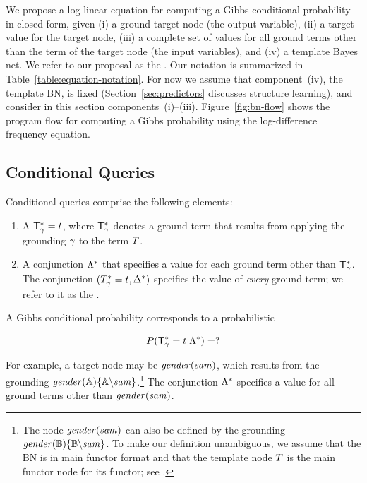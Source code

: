\documentclass[twoside,11pt]{article}
\begin{document}
We propose a log-linear equation for computing a Gibbs conditional probability in closed form, given (i) a ground target node (the output variable), (ii) a target value for the target node, (iii) a complete set of values for all ground terms other than the term of the target node (the input variables), and (iv) a template Bayes net. We refer to our proposal as the 
. Our notation is summarized in Table~\ref{table:equation-notation}. For now we assume that component~(iv), the template BN, is fixed (Section~\ref{sec:predictors} discusses structure learning), and consider in this section components~(i)--(iii). 
Figure~\ref{fig:bn-flow} shows the program flow for computing a Gibbs probability using the log-difference frequency equation.

% 



 \subsection{Conditional Queries} Conditional queries comprise the following elements:
 
\begin{enumerate}
\item A  $\mathsf{T}_\gamma^{*}\hspace{0.0ex} = t$, where $\mathsf{T}_\gamma^{*}\hspace{0.0ex}$ denotes a ground term that results from applying the grounding $\gamma$ to the term $T$.
\item A conjunction $\Lambda^{*}\hspace{0.0ex}$ that specifies a value for each ground term other than $\mathsf{T}_\gamma^{*}\hspace{0.0ex}$. The conjunction $(T_\gamma^{*}\hspace{0.0ex} = t, \Delta^{*}\hspace{0.0ex})$ specifies the value of {\em every} ground term; we refer to it as the .
\end{enumerate}

A Gibbs conditional probability corresponds to a probabilistic 

$$P(\mathsf{T}_\gamma^{*}\hspace{0.0ex} = t | \Lambda^{*}\hspace{0.0ex}) = ?$$

\noindent For example, a target node may be $\it{gender}(sam)$, which results from the grounding $\it{gender}(\mathbb{A})\{\mathbb{A}\backslash sam\}$.\footnote{The node $\it{gender}(sam)$ can also be defined by the grounding $\it{gender}(\mathbb{B})\{\mathbb{B}\backslash sam\}$. To make our definition unambiguous, we assume that the BN is in main functor format and that the template node $T$ is the main functor node for its functor; see \cite{Schulte2012a}.}  The conjunction $\Lambda^{*}\hspace{0.0ex}$ specifies a value for all ground terms other than $\it{gender}(sam)$.
\end{document}

